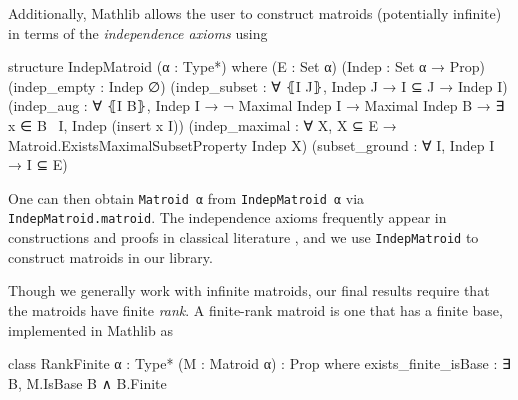 Additionally, Mathlib allows the user to construct matroids (potentially infinite) in terms of the \emph{independence axioms} using
\begin{leancode}
structure IndepMatroid (α : Type*) where
  (E : Set α)
  (Indep : Set α → Prop)
  (indep_empty : Indep ∅)
  (indep_subset : ∀ ⦃I J⦄,
    Indep J → I ⊆ J → Indep I)
  (indep_aug : ∀ ⦃I B⦄, Indep I → 
    ¬ Maximal Indep I →
    Maximal Indep B →
    ∃ x ∈ B \ I, Indep (insert x I))
  (indep_maximal : ∀ X, X ⊆ E → 
    Matroid.ExistsMaximalSubsetProperty
    Indep X)
  (subset_ground : ∀ I, Indep I → I ⊆ E)
\end{leancode}
One can then obtain \texttt{Matroid α} from \texttt{IndepMatroid α} via \texttt{IndepMatroid.matroid}. The independence axioms frequently appear in constructions and proofs in classical literature \cite{Oxley2011,Truemper2016}, and we use \texttt{IndepMatroid} to construct matroids in our library.

Though we generally work with infinite matroids, our final results require that the matroids have finite \emph{rank}. A finite-rank matroid is one that has a finite base, implemented in Mathlib as
\begin{leancode}
class RankFinite {α : Type*} (M : Matroid α) :
    Prop where
  exists_finite_isBase :
    ∃ B, M.IsBase B ∧ B.Finite
\end{leancode}

\begin{comment}
    If we really need to save space, I can imagine entirely leaving out implementation details of \texttt{Matroid} and \texttt{IndepMatroid} and only providing their signatures. This would move the focus towards how to use/work with matroids, especially in the context of our project, and omit how they are implemented in Mathlib.
\end{comment}
